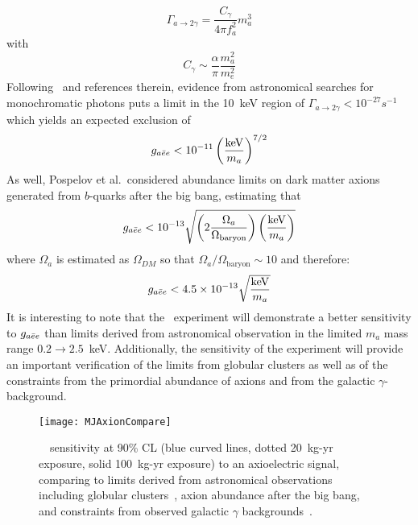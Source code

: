 			\begin{equation}
				\Gamma_{a \to 2 \gamma} = \frac{C_\gamma}{4 \pi f_a^2} m_a^3
			\end{equation}
with
			\begin{equation}
				C_\gamma \sim \frac{\alpha}{\pi} \frac{m_{a}^{2}}{m_{e}^{2}}
			\end{equation}
Following~\cite{Pospelov:2008jk} and references therein, evidence from astronomical searches for monochromatic photons puts a limit in the 10~keV region of $\Gamma_{a \to 2 \gamma} < 10^{-27} s^{-1}$ which yields an expected exclusion of 
			\begin{equation}
				g_{a\bar{e}e} < 10^{-11} \left(\frac{\text{keV}}{m_{a}}\right)^{7/2}
			\end{equation}
As well, Pospelov et al.~considered abundance limits on dark matter axions generated from $b$-quarks after the big bang, estimating that 
			\begin{equation}
				g_{a\bar{e}e} < 10^{-13} \sqrt{
					\left( 2 \frac{\Omega_a}{\Omega_{\text{baryon}}} \right)
					\left( \frac{\text{keV}}{m_a}\right)
				}
			\end{equation}
where $\Omega_{a}$ is estimated as $\Omega_{DM}$ so that $\Omega_a/\Omega_{\text{baryon}} \sim 10$ and therefore:
			\begin{equation}
				g_{a\bar{e}e} < 4.5 \times 10^{-13} \sqrt{\frac{\text{keV}}{m_a}}
			\end{equation}
	It is interesting to note that the \MJ~experiment will demonstrate a better sensitivity to $g_{a\bar{e}e}$ than limits derived from astronomical observation in the limited $m_{a}$ mass range $0.2\to2.5$~keV.  Additionally, the sensitivity of the experiment will provide an important verification of the limits from globular clusters as well as of the constraints from the primordial abundance of axions and from the galactic $\gamma$-background.
					
			\begin{figure}
				\centering
				\texttt{[image: MJAxionCompare]}
				\caption{\MJ~\minmod~sensitivity at 90\% CL (blue curved lines, dotted 20~kg-yr exposure, solid 100~kg-yr exposure) to an axioelectric signal, 
				comparing to limits derived from astronomical observations including globular clusters~\cite{Raffelt95}, 
				axion abundance after the big bang, and constraints from observed galactic $\gamma$ 
				backgrounds~\cite{Pospelov:2008jk}.}
				\label{fig:MJSensitivityToHeavyAxionsCompare}
			\end{figure}							

